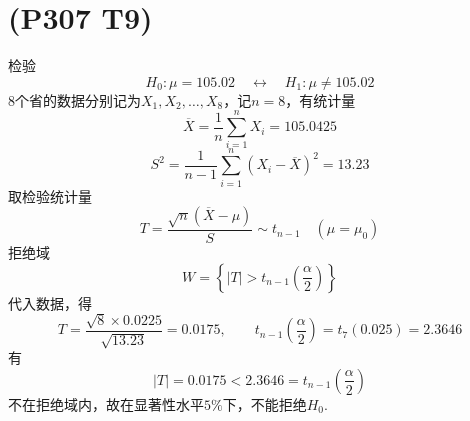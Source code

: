 \documentclass{article}
\begin{document}
\section{(P307 T9)}  %
    检验
    \[
        H_0 : \mu = 105.02 
        \quad \leftrightarrow \quad
        H_1 : \mu \neq 105.02        
    \]
    8个省的数据分别记为$X_1 , X_2, \ldots, X_8$，记$n = 8$，有统计量
    \[
        \overline{X} 
        = \frac{1}{n} \sum\limits_{i=1}^{n} X_i
        = 105.0425
    \]
    \[
        S^2
        = \frac{1}{n-1} \sum\limits_{i=1}^{n} {(X_i - \overline{X})}^2
        = 13.23
    \]
    取检验统计量
    \[
        T 
        = \frac{\sqrt{n} (\overline{X} - \mu)}{S}  
        \sim t_{n-1}
        \quad (\mu = \mu_{0})
    \]
    拒绝域
    \[
        W =
        \left\{
            |T| > t_{n-1}\left(\frac{\alpha}{2}\right)     
        \right\}
    \]
    代入数据，得
    \[
        T 
        = \frac{\sqrt{8}\times 0.0225}{\sqrt{13.23}} 
        = 0.0175,
        \qquad
        t_{n-1}\left(\frac{\alpha}{2}\right)
        = t_{7}(0.025)
        = 2.3646
    \]
    有
    \[
        |T| = 0.0175 < 2.3646 = t_{n-1}\left(\frac{\alpha}{2}\right)    
    \]
    不在拒绝域内，故在显著性水平$5\%$下，不能拒绝$H_0$.
\end{document}
